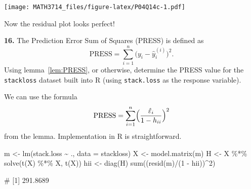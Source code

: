 \documentclass[
  a4paper,
]{article}
\newenvironment{Shaded}{\begin{snugshade}}{\end{snugshade}}
\newcommand{\AttributeTok}[1]{\textcolor[rgb]{0.77,0.63,0.00}{#1}}
\newcommand{\DecValTok}[1]{\textcolor[rgb]{0.00,0.00,0.81}{#1}}
\newcommand{\FunctionTok}[1]{\textcolor[rgb]{0.00,0.00,0.00}{#1}}
\newcommand{\NormalTok}[1]{#1}
\newcommand{\OtherTok}[1]{\textcolor[rgb]{0.56,0.35,0.01}{#1}}
\newcommand{\SpecialCharTok}[1]{\textcolor[rgb]{0.00,0.00,0.00}{#1}}
\theoremstyle{definition}
\theoremstyle{definition}
\theoremstyle{definition}
\theoremstyle{definition}
\theoremstyle{remark}
\begin{document}
\begin{myanswers}
\begin{Shaded}
\end{Shaded}

\texttt{[image: MATH3714\_files/figure-latex/P04Q14c-1.pdf]}

Now the residual plot looks perfect!

\end{myanswers}

\textbf{16.} The Prediction Error Sum of Squares (PRESS) is defined as
\begin{equation*}
  \mathrm{PRESS}
  = \sum_{i=1}^n \bigl( y_i - \hat y^{(i)}_i \bigr)^2.
\end{equation*}
Using lemma~\ref{lem:PRESS}, or otherwise, determine the PRESS
value for the \texttt{stackloss} dataset built into R (using \texttt{stack.loss}
as the response variable).

\begin{myanswers}

We can use the formula
\begin{equation*}
  \mathrm{PRESS}
  = \sum_{i=1}^n \Bigl( \frac{\hat\varepsilon_i}{1 - h_{ii}} \Bigr)^2
\end{equation*}
from the lemma. Implementation in R is straightforward.

\begin{Shaded}
\begin{Highlighting}[]
\NormalTok{m }\OtherTok{\textless{}{-}} \FunctionTok{lm}\NormalTok{(stack.loss }\SpecialCharTok{\textasciitilde{}}\NormalTok{ ., }\AttributeTok{data =}\NormalTok{ stackloss)}
\NormalTok{X }\OtherTok{\textless{}{-}} \FunctionTok{model.matrix}\NormalTok{(m)}
\NormalTok{H }\OtherTok{\textless{}{-}}\NormalTok{ X }\SpecialCharTok{\%*\%} \FunctionTok{solve}\NormalTok{(}\FunctionTok{t}\NormalTok{(X) }\SpecialCharTok{\%*\%}\NormalTok{ X, }\FunctionTok{t}\NormalTok{(X))}
\NormalTok{hii }\OtherTok{\textless{}{-}} \FunctionTok{diag}\NormalTok{(H)}
\FunctionTok{sum}\NormalTok{((}\FunctionTok{resid}\NormalTok{(m)}\SpecialCharTok{/}\NormalTok{(}\DecValTok{1} \SpecialCharTok{{-}}\NormalTok{ hii))}\SpecialCharTok{\^{}}\DecValTok{2}\NormalTok{)}
\end{Highlighting}
\end{Shaded}

\begin{Shaded}
\begin{Highlighting}[]
\NormalTok{\# [1] 291.8689}
\end{Highlighting}
\end{Shaded}

\end{myanswers}
\end{document}

